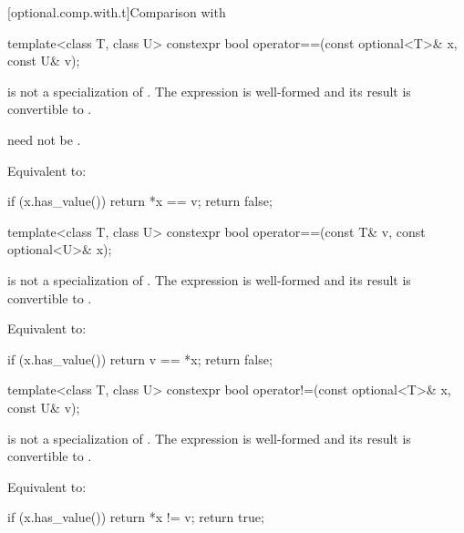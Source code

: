 [optional.comp.with.t]{Comparison with }

%
\begin{itemdecl}
template<class T, class U>
  constexpr bool operator==(const optional<T>& x, const U& v);
\end{itemdecl}

\begin{itemdescr}
\pnum
\constraints
{} is not a specialization of . The expression  is well-formed and its result is convertible to .
\begin{note}
 need not be .
\end{note}

\pnum
\effects
Equivalent to:
\begin{codeblock}
if (x.has_value())
  return *x == v;
return false;
\end{codeblock}
\end{itemdescr}

%
\begin{itemdecl}
template<class T, class U>
  constexpr bool operator==(const T& v, const optional<U>& x);
\end{itemdecl}

\begin{itemdescr}
\pnum
\constraints
{} is not a specialization of . The expression  is well-formed and its result is convertible to .

\pnum
\effects
Equivalent to:
\begin{codeblock}
if (x.has_value())
  return v == *x;
return false;
\end{codeblock}
\end{itemdescr}

\begin{removedblock}
%
\begin{itemdecl}
template<class T, class U> constexpr bool operator!=(const optional<T>& x, const U& v);
\end{itemdecl}

\begin{itemdescr}
\pnum
\constraints
{} is not a specialization of . The expression  is well-formed and its result is convertible to .

\pnum
\effects
Equivalent to:
\begin{codeblock}
if (x.has_value())
  return *x != v;
return true;
\end{codeblock}
\end{itemdescr}
\end{removedblock}

